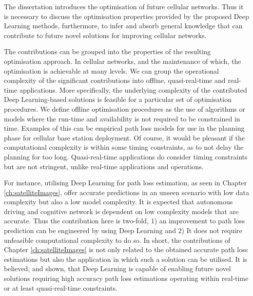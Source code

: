 The dissertation introduces the optimisation of future cellular networks. Thus it is necessary to discuss the optimisation properties provided by the proposed Deep Learning methods, furthermore, to infer and absorb general knowledge that can contribute to future novel solutions for improving cellular networks.

The contributions can be grouped into the properties of the resulting optimisation approach. In cellular networks, and the maintenance of which, the optimisation is achievable at many levels. We can group the operational complexity of the significant contributions into offline, quasi-real-time and real-time applications. More specifically, the underlying complexity of the contributed Deep Learning-based solutions is feasible for a particular set of optimisation procedures. We define offline optimisation procedures as the use of algorithms or models where the run-time and availability is not required to be constrained in time. Examples of this can be empirical path loss models for use in the planning phase for cellular base station deployment. Of course, it would be pleasant if the computational complexity is within some timing constraints, as to not delay the planning for too long. Quasi-real-time applications do consider timing constraints but are not stringent, unlike real-time applications and operations. 

For instance, utilising Deep Learning for path loss estimation, as seen in Chapter \ref{ch:satelliteImages}, offer accurate predictions in an unseen scenario with low data complexity but also a low model complexity. It is expected that autonomous driving and cognitive network is dependent on low complexity models that are accurate. Thus the contribution here is two-fold, 1) an improvement to path loss prediction can be engineered by using Deep Learning and 2) It does not require unfeasible computational complexity to do so. In short, the contributions of Chapter \ref{ch:satelliteImages} is not only related to the obtained accurate path loss estimations but also the application in which such a solution can be utilised. It is believed, and shown, that Deep Learning is capable of enabling future novel solutions requiring high accuracy path loss estimations operating within real-time or at least quasi-real-time constraints. 

